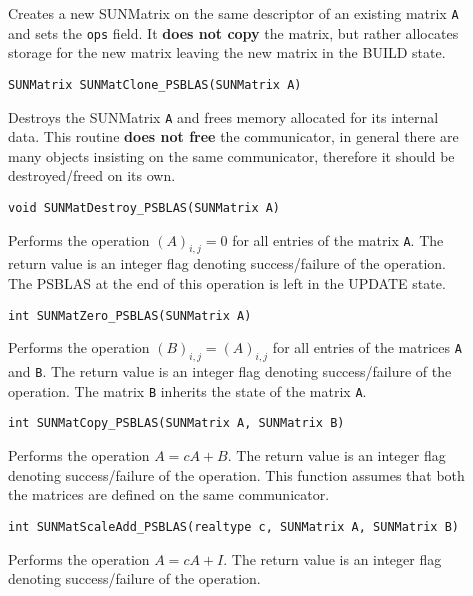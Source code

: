 \documentclass[twoside,a4paper]{refart}
\theoremstyle{definition}
\begin{document}
\begin{description}
\item[] Creates a new SUNMatrix on the same descriptor of an existing matrix \texttt{A} and sets
the \texttt{ops} field. It \textbf{does not copy} the matrix, but rather allocates storage for the new matrix leaving the new matrix in the BUILD state.

 \lstinline[style=CStyle]|SUNMatrix SUNMatClone_PSBLAS(SUNMatrix A)|

\item[] Destroys the SUNMatrix \texttt{A} and frees memory allocated for its internal data. This routine \textbf{does not free} the communicator, in general there are many objects insisting on the same communicator, therefore it should be destroyed/freed on its own.

 \lstinline[style=CStyle]|void SUNMatDestroy_PSBLAS(SUNMatrix A)|

\item[] Performs the operation $(A)_{i,j} = 0$ for all entries of the matrix \texttt{A}. The return value is an integer flag denoting success/failure of the operation. The PSBLAS at the end of this operation is left in the UPDATE state.

 \lstinline[style=CStyle]|int SUNMatZero_PSBLAS(SUNMatrix A)|

\item[] Performs the operation $(B)_{i,j} = (A)_{ i,j}$ for all entries of the matrices \texttt{A} and \texttt{B}. The return value is an integer flag denoting success/failure of the operation. The matrix \texttt{B} inherits the state of the matrix \texttt{A}.

 \lstinline[style=CStyle]|int SUNMatCopy_PSBLAS(SUNMatrix A, SUNMatrix B)|

\item[] Performs the operation $A = cA + B$. The return value is an integer flag denoting success/failure of the operation. This function assumes that both the matrices are defined on the same communicator.

 \lstinline[style=CStyle]|int SUNMatScaleAdd_PSBLAS(realtype c, SUNMatrix A, SUNMatrix B)|

\item[] Performs the operation $A = cA + I$. The return value is an integer flag denoting success/failure of the operation.


\end{description}
\end{document}
